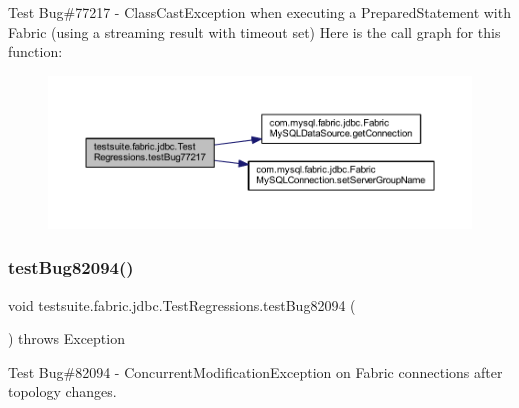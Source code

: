Test Bug\#77217 -\/ Class\+Cast\+Exception when executing a Prepared\+Statement with Fabric (using a streaming result with timeout set) Here is the call graph for this function\+:
\nopagebreak
\begin{figure}[H]
\begin{center}
\leavevmode
\includegraphics[width=350pt]{classtestsuite_1_1fabric_1_1jdbc_1_1_test_regressions_a3ce60c17f8f082b01d2d313de8a469e3_cgraph}
\end{center}
\end{figure}
\mbox{\label{classtestsuite_1_1fabric_1_1jdbc_1_1_test_regressions_a7b46187e3a7d4a9951d8cd51344b090e}} 
\subsubsection{\texorpdfstring{test\+Bug82094()}{testBug82094()}}
{\footnotesize\ttfamily void testsuite.\+fabric.\+jdbc.\+Test\+Regressions.\+test\+Bug82094 (\begin{DoxyParamCaption}{ }\end{DoxyParamCaption}) throws Exception}

Test Bug\#82094 -\/ Concurrent\+Modification\+Exception on Fabric connections after topology changes.

